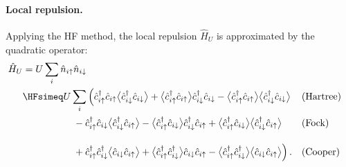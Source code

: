 \paragraph{Local repulsion.} Applying the HF method, the local repulsion $\hat H_U$ is approximated by the quadratic operator:
\begin{align}
	\hat H_U &= U \sum_i \hat n_{i\uparrow} \hat n_{i\downarrow} \label{eq:mft-HU} \\
	&\HFsimeq U \sum_i \Big(
	\hat c_{i\uparrow}^\dagger \hat c_{i\uparrow} \big\langle \hat c_{i\downarrow}^\dagger \hat c_{i\downarrow} \big\rangle + \big\langle \hat c_{i\uparrow}^\dagger \hat c_{i\uparrow} \big\rangle \hat c_{i\downarrow}^\dagger \hat c_{i\downarrow} - \big\langle \hat c_{i\uparrow}^\dagger \hat c_{i\uparrow} \big\rangle  \big\langle \hat c_{i\downarrow}^\dagger \hat c_{i\downarrow} \big\rangle &&(\text{Hartree}) \nonumber\\
	&\phantom{\simeq \sum_{{i\uparrow}\neq{i\downarrow}} V_{{i\uparrow}{i\downarrow}}}
	- \hat c_{i\uparrow}^\dagger \hat c_{i\downarrow} \big\langle \hat c_{i\downarrow}^\dagger \hat c_{i\uparrow} \big\rangle - \big\langle \hat c_{i\uparrow}^\dagger \hat c_{i\downarrow} \big\rangle \hat c_{i\downarrow}^\dagger \hat c_{i\uparrow} + \big\langle \hat c_{i\uparrow}^\dagger \hat c_{i\downarrow} \big\rangle  \big\langle \hat c_{i\downarrow}^\dagger \hat c_{i\uparrow} \big\rangle &&(\text{Fock}) \nonumber\\
	&\phantom{\simeq \sum_{{i\uparrow}\neq{i\downarrow}} V_{{i\uparrow}{i\downarrow}}}
	+ \hat c_{i\uparrow}^\dagger \hat c_{i\downarrow}^\dagger \big\langle \hat c_{i\downarrow} \hat c_{i\uparrow} \big\rangle + \big\langle \hat c_{i\uparrow}^\dagger \hat c_{i\downarrow}^\dagger \big\rangle \hat c_{i\downarrow} \hat c_{i\uparrow} - \big\langle \hat c_{i\uparrow}^\dagger \hat c_{i\downarrow}^\dagger \big\rangle  \big\langle \hat c_{i\downarrow} \hat c_{i\uparrow} \big\rangle
	\Big) \, . &&(\text{Cooper}) \nonumber
\end{align}

